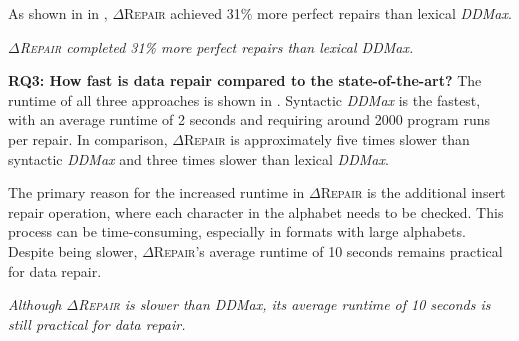 \documentclass[acmsmall,screen,review,anonymous]{acmart}
\newenvironment{result}{\begin{framed}\centering\it}{\end{framed}}
\newcommand{\dtask}{data repair\xspace}
\newcommand{\approach}{\textsc{$\Delta$Repair}\xspace}
\newcommand{\ddmax}{\textit{DDMax}\xspace}
\newcommand{\drepair}{\approach}
\begin{document}
As shown in in ,
\drepair achieved 31\% more perfect repairs than lexical \ddmax.


\begin{result}
\drepair completed 31\% more perfect repairs than lexical \ddmax.
\end{result}


\noindent\textbf{RQ3: How fast is \dtask compared to the state-of-the-art?}
The runtime of all three approaches is shown in .
Syntactic \ddmax is the fastest, with an average runtime of 2 seconds and
requiring around 2000 program runs per repair.
In comparison, \drepair is approximately five times slower than syntactic
\ddmax and three times slower than lexical \ddmax.

The primary reason for the increased runtime in \drepair is the additional
insert repair operation, where each character in the alphabet needs to be
checked. This process can be time-consuming, especially in formats with
large alphabets.
Despite being slower, \drepair's average runtime of 10 seconds remains practical
for \dtask.

\begin{result}
Although \drepair is slower than \ddmax, its average runtime of 10 seconds is
still practical for \dtask.
\end{result}
\end{document}
